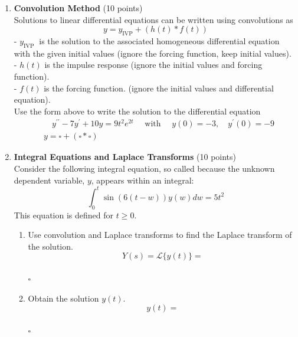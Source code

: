 \begin{enumerate}
  \newpage

  \item \textbf{Convolution Method} (10 points)\\
  Solutions to linear differential equations can be written using convolutions as
  $$
  y=y_{\mathrm{IVP}}+(h(t) * f(t))
  $$
  - $y_{\text {IVP }}$ is the solution to the associated homogeneous differential equation with the given initial values
  (ignore the forcing function, keep initial values).\\
  - $h(t)$ is the impulse response
  (ignore the initial values and forcing function).\\
  - $f(t)$ is the forcing function.
  (ignore the initial values and differential equation).\\
  Use the form above to write the solution to the differential equation
  $$
  \begin{aligned}
  & \quad y^{\prime \prime}-7 y^{\prime}+10 y=9 t^2 e^{2 t} \quad \text { with } \quad y(0)=-3, \quad y^{\prime}(0)=-9 \\
  & y=\square+(\square * \square)
  \end{aligned}
  $$
  \begin{subanswer}
  \end{subanswer}

  \item \textbf{Integral Equations and Laplace Transforms} (10 points)\\
  Consider the following integral equation, so called because the unknown dependent variable, $y$, appears within an integral:
  $$
  \int_0^t \sin (6(t-w)) y(w) d w=5 t^2
  $$
  This equation is defined for $t \geq 0$.
  \begin{enumerate}[label=(\alph*)]
    \item Use convolution and Laplace transforms to find the Laplace transform of the solution.\\
    $$
    Y(s)=\mathcal{L}\{y(t)\}=
    $$\\
    $\square$\\
    \begin{subanswer}
    \end{subanswer}
    \item Obtain the solution $y(t)$.\\
    $$
    y(t)=
    $$\\
    $\square$\\
    \begin{subanswer}
    \end{subanswer}
  \end{enumerate}


\end{enumerate}
